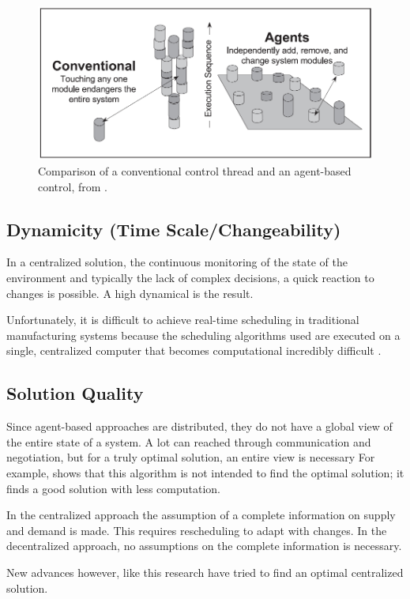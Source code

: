 \begin{figure}[h]
\centering
\includegraphics[width=0.7\linewidth]{img/modularity+decentral-changeability}
\caption{Comparison of a conventional control thread and an agent-based control, from \citep{parunak1999industrial}.}
\label{fig:modularitydecentral-changeability}
\end{figure}



\subsection{Dynamicity (Time Scale/Changeability)}
In a centralized solution, the continuous monitoring of the state of the environment and typically the lack of complex decisions, a quick reaction to changes is possible. A high dynamical is the result. 

Unfortunately, it is difficult to achieve real-time scheduling in traditional manufacturing systems because the scheduling algorithms used are executed on a single, centralized computer that becomes computational incredibly difficult \citep{duffie1994real}.
\subsection{Solution Quality}
Since agent-based approaches are distributed, they do not have a global view of the entire state of a system. A lot can reached through communication and negotiation, but for a truly optimal solution, an entire view is necessary For example,  \citep{palmer2003decentralized} shows that this algorithm is not intended to find the optimal solution; it finds a good solution with less computation. 

In the centralized approach the assumption of a complete information on supply and demand is made. This requires rescheduling to adapt with changes. In the decentralized approach, no assumptions on the complete information is necessary. 

New advances however, like this research have tried to find an optimal centralized solution. 


